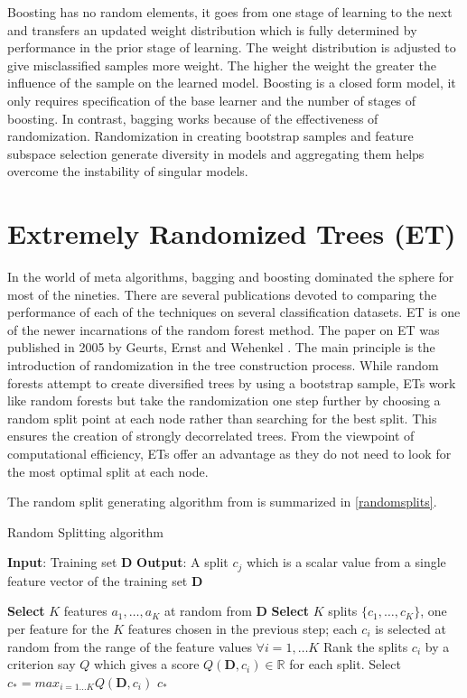 Boosting has no random elements, it goes from one stage of learning to the next and transfers an updated weight distribution which is fully determined by performance in the prior stage of learning. The weight distribution is adjusted to give misclassified samples more weight. The higher the weight the greater the influence of the sample on the learned model. Boosting is a closed form model, it only requires specification of the base learner and the number of stages of boosting. In contrast, bagging works because of the effectiveness of randomization. Randomization in creating bootstrap samples and feature subspace selection generate diversity in models and aggregating them helps overcome the instability of singular models. 

\section{Extremely Randomized Trees (ET)}

In the world of meta algorithms, bagging and boosting dominated the sphere for most of the nineties. There are several publications devoted to comparing the performance of each of the techniques on several classification datasets. \gls{ET} is one of the newer incarnations of the random forest method. The paper on ET was published in 2005 by  Geurts, Ernst and Wehenkel \cite{xrf}. The main principle is the introduction of randomization in the tree construction process. While random forests attempt to create diversified trees by using a bootstrap sample, ETs work like random forests but take the randomization one step further by choosing a random split point at each node rather than searching for the best split. This ensures the creation of strongly decorrelated trees. From the viewpoint of computational efficiency, ETs offer an advantage as they do not need to look for the most optimal split at each node. 

The random split generating algorithm from \cite{xrf} is summarized in \ref{randomsplits}. 

\begin{algorithm}[H]
\caption{Random Splitting algorithm}
\begin{algorithmic}[1]
\STATE \textbf{Input}: Training set $\mathbf{D}$
\STATE \textbf{Output}: A split $c_{j}$ which is a scalar value from a single feature vector of the training set $\mathbf{D}$  
\item[]
\STATE \textbf{Select} $K$ features ${a_{1}, \dots , a_{K}}$ at random from $\mathbf{D}$
\STATE \textbf{Select} $K$ splits $\{c_{1}, \dots , c_{K}\}$, one per feature for the $K$ features chosen in the previous step; each $c_{i}$ is selected at random from the range of the feature values $\forall i = 1, \dots K$  
\STATE Rank the splits $c_{i}$ by a criterion say $Q$ which gives a score $Q(\mathbf{D}, c_{i}) \in \mathbb{R}$ for each split. 
\STATE Select $c_{*} = max_{i=1 \dots K}Q(\mathbf{D}, c_{i})$  
\RETURN $c_{*}$
\end{algorithmic}
\label{randomsplits}
\end{algorithm}


